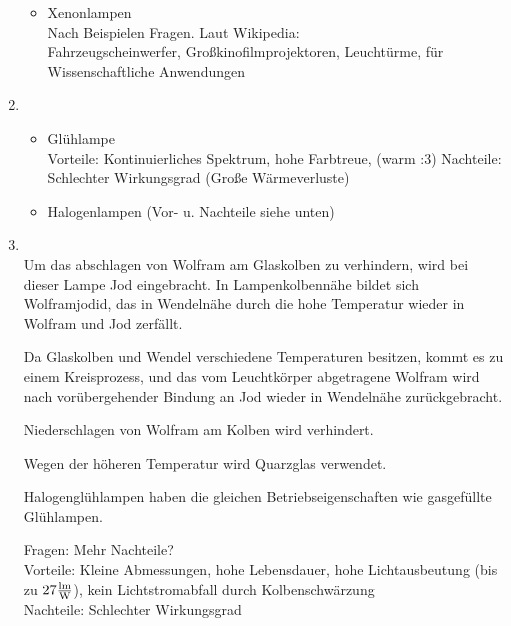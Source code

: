 \begin{enumerate}
\begin{itemize}
                \item Xenonlampen\\
                    Nach Beispielen Fragen. Laut Wikipedia:\\
                    Fahrzeugscheinwerfer, Großkinofilmprojektoren, Leuchtürme, für Wissenschaftliche Anwendungen
            \end{itemize}

    \item   {}\\
            
            \begin{itemize}
                \item Glühlampe\\
                    Vorteile: Kontinuierliches Spektrum, hohe Farbtreue, (warm :3)
                    Nachteile: Schlechter Wirkungsgrad (Große Wärmeverluste)

                \item Halogenlampen (Vor- u. Nachteile siehe unten)
            \end{itemize}


    \item   {}\\
    
    Um das abschlagen von Wolfram am Glaskolben zu verhindern, wird bei dieser Lampe Jod eingebracht. In Lampenkolbennähe bildet
    sich Wolframjodid, das in Wendelnähe durch die hohe Temperatur wieder in Wolfram und
    Jod zerfällt.
    
    Da Glaskolben und Wendel verschiedene Temperaturen besitzen, kommt es zu einem
    Kreisprozess, und das vom Leuchtkörper abgetragene Wolfram wird nach vorübergehender
    Bindung an Jod wieder in Wendelnähe zurückgebracht.
    
    Niederschlagen von Wolfram am Kolben wird verhindert.
    
    Wegen der höheren Temperatur wird Quarzglas verwendet.
    
    Halogenglühlampen haben die gleichen Betriebseigenschaften wie gasgefüllte Glühlampen.

            Fragen: Mehr Nachteile?\\
            Vorteile: Kleine Abmessungen, hohe Lebensdauer, hohe Lichtausbeutung (bis zu $27\frac{\textnormal{lm}}{\textnormal{W}}$), kein Lichtstromabfall durch Kolbenschwärzung\\
            Nachteile: Schlechter Wirkungsgrad
\end{enumerate}